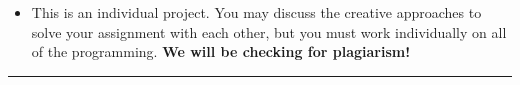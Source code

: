 \documentclass[11pt]{report}
\begin{document}
\begin{itemize}
    \vspace{0.5em}
    {\tt \#\ PART 1.1 Comment here ...}
    \vspace{0.5em}
    
    Note that the order that the answers to the questions appear in the code may be different to the order they appear in this document so it is important to indicate to the marker where you have attempted to answer each question. You should also use comments to show what your code does. 
    \item This is an individual project. You may discuss the creative approaches to solve your assignment with each other, but you must work individually on all of the programming. 
    	\textbf{We will be checking for plagiarism!}
    \end{itemize}
    
\vspace{1em}
\hrule
\vspace{1em}
    
\end{document}
